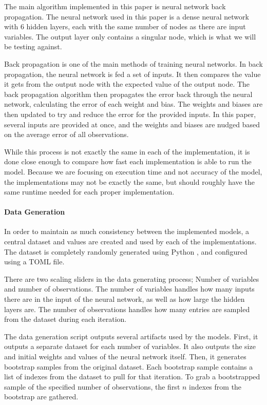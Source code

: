 \documentclass[12pt]{article}
\begin{document}
The main algorithm implemented in this paper is neural network back propagation.
The neural network used in this paper is a dense neural network with 6 hidden layers, each with the same number of nodes as there are input variables.
The output layer only contains a singular node, which is what we will be testing against.

Back propagation is one of the main methods of training neural networks.
In back propagation, the neural network is fed a set of inputs.
It then compares the value it gets from the output node with the expected value of the output node.
The back propagation algorithm then propagates the error back through the neural network, calculating the error of each weight and bias.
The weights and biases are then updated to try and reduce the error for the provided inputs.
In this paper, several inputs are provided at once, and the weights and biases are nudged based on the average error of all observations.

While this process is not exactly the same in each of the implementation, it is done close enough to compare how fast each implementation is able to run the model.
Because we are focusing on execution time and not accuracy of the model, the implementations may not be exactly the same, but should roughly have the same runtime needed for each proper implementation.


\paragraph{Data Generation}
In order to maintain as much consistency between the implemented models, a central dataset and values are created and used by each of the implementations.
The dataset is completely randomly generated using Python \cite{lang_python}, and configured using a TOML file.

There are two scaling sliders in the data generating process; Number of variables and number of observations.
The number of variables handles how many inputs there are in the input of the neural network, as well as how large the hidden layers are.
The number of observations handles how many entries are sampled from the dataset during each iteration.

The data generation script outputs several artifacts used by the models.
First, it outputs a separate dataset for each number of variables.
It also outputs the size and initial weights and values of the neural network itself.
Then, it generates bootstrap samples from the original dataset.
Each bootstrap sample contains a list of indexes from the dataset to pull for that iteration.
To grab a bootstrapped sample of the specified number of observations, the first $n$ indexes from the bootstrap are gathered.
\end{document}
